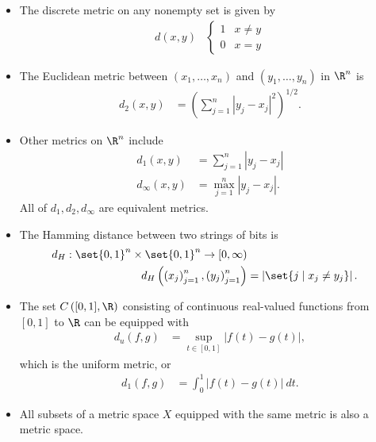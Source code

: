 \begin{example}
  \begin{itemize}
    \item The discrete metric on any nonempty set is given by
      \begin{align*}
        d\left(x,y\right) & \begin{cases}
          1 & x\neq y\\
          0 & x = y
        \end{cases}
      \end{align*}
    \item The Euclidean metric between $\left(x_1,\dots,x_n\right)$ and $\left(y_1,\dots,y_n\right)$ in $\R^n$ is
      \begin{align*}
        d_{2}\left(x,y\right) &= \left(\sum_{j=1}^{n}\left\vert y_j-x_j \right\vert^2\right)^{1/2}.
      \end{align*}
    \item Other metrics on $\R^n$ include
      \begin{align*}
        d_1\left(x,y\right) &= \sum_{j=1}^{n}\left\vert y_j-x_j \right\vert\\
        d_{\infty}\left(x,y\right) &= \max_{j=1}^{n}\left\vert y_j - x_j \right\vert.
      \end{align*}
      All of $d_1,d_2,d_{\infty}$ are equivalent metrics.
    \item The Hamming distance between two strings of bits is
      \begin{align*}
        d_{H}: \set{0,1}^{n}\times \set{0,1}^{n}\rightarrow [0,\infty)\\
        d_{H}\left(\left(x_{j}\right)_{j=1}^{n},\left(y_j\right)_{j=1}^{n}\right) &= \left\vert \set{j\mid x_j\neq y_j} \right\vert.
      \end{align*}
    \item The set $C\left([0,1],\R\right)$ consisting of continuous real-valued functions from $[0,1]$ to $\R$ can be equipped with
      \begin{align*}
        d_u\left(f,g\right) &= \sup_{t\in [0,1]}\left\vert f(t) - g(t) \right\vert,
      \end{align*}
      which is the uniform metric, or
      \begin{align*}
        d_{1}\left(f,g\right) &= \int_{0}^{1} \left\vert f(t)-g(t) \right\vert\:dt.
      \end{align*}
    \item All subsets of a metric space $X$ equipped with the same metric is also a metric space.

\end{itemize}
\end{example}
